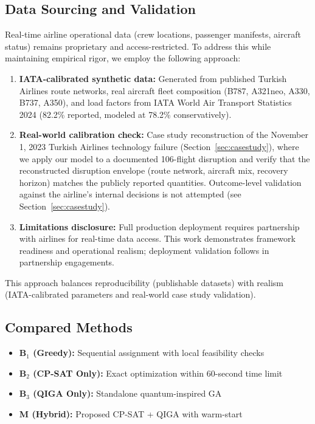 \documentclass[12pt,number]{elsarticle}
\begin{document}
\subsection{Data Sourcing and Validation}

Real-time airline operational data (crew locations, passenger manifests, aircraft status) remains proprietary and access-restricted. To address this while maintaining empirical rigor, we employ the following approach:

\begin{enumerate}
\item \textbf{IATA-calibrated synthetic data:} Generated from published Turkish Airlines route networks, real aircraft fleet composition (B787, A321neo, A330, B737, A350), and load factors from IATA World Air Transport Statistics 2024 (82.2\% reported, modeled at 78.2\% conservatively).

\item \textbf{Real-world calibration check:} Case study reconstruction of the November 1, 2023 Turkish Airlines technology failure (Section~\ref{sec:casestudy}), where we apply our model to a documented 106-flight disruption and verify that the reconstructed disruption envelope (route network, aircraft mix, recovery horizon) matches the publicly reported quantities. Outcome-level validation against the airline's internal decisions is not attempted (see Section~\ref{sec:casestudy}).

\item \textbf{Limitations disclosure:} Full production deployment requires partnership with airlines for real-time data access. This work demonstrates framework readiness and operational realism; deployment validation follows in partnership engagements.
\end{enumerate}

This approach balances reproducibility (publishable datasets) with realism (IATA-calibrated parameters and real-world case study validation).

\subsection{Compared Methods}

\begin{itemize}
    \item \textbf{B$_1$ (Greedy):} Sequential assignment with local feasibility checks
    \item \textbf{B$_2$ (CP-SAT Only):} Exact optimization within 60-second time limit
    \item \textbf{B$_3$ (QIGA Only):} Standalone quantum-inspired GA
    \item \textbf{M (Hybrid):} Proposed CP-SAT + QIGA with warm-start
\end{itemize}
\end{document}
